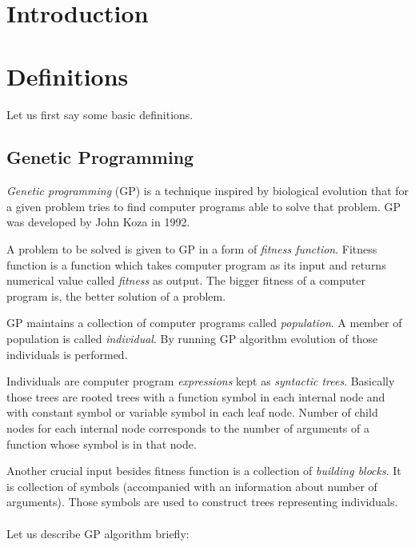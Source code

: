 \documentclass[12pt,a4paper]{report}
\newcommand{\Lets}{Let us }
\begin{document}
\newpage


\tableofcontents	
	
\chapter*{Introduction}
	
\chapter{Definitions}
	
	\Lets first say some basic definitions.

\section{Genetic Programming}

\textit{Genetic programming} (GP) is a technique inspired by biological evolution
that for a given problem tries to find computer programs able to solve that problem. 
GP was developed by John Koza \cite{koza92} in 1992.

A problem to be solved is given to GP in a form of \textit{fitness function}. 
Fitness function is a function which takes computer program as its input and 
returns numerical value called \textit{fitness} as output. 
The bigger fitness of a computer program is, the better solution of a problem.

GP maintains a collection of computer programs called \textit{population}. 
A member of population is called \textit{individual}. 
By running GP algorithm evolution of those individuals is performed.

Individuals are computer program \textit{expressions} kept as \textit{syntactic trees}. 
Basically those trees are rooted trees with a function symbol in each internal node 
and with constant symbol or variable symbol in each leaf node. 
Number of child nodes for each internal node corresponds to the number of arguments of a function whose
symbol is in that node.

Another crucial input besides fitness function is a collection of \textit{building blocks}.
It is collection of symbols (accompanied with an information about number of arguments).
Those symbols are used to construct trees representing individuals.  
\\\\
\Lets describe GP algorithm briefly:
\end{document}
